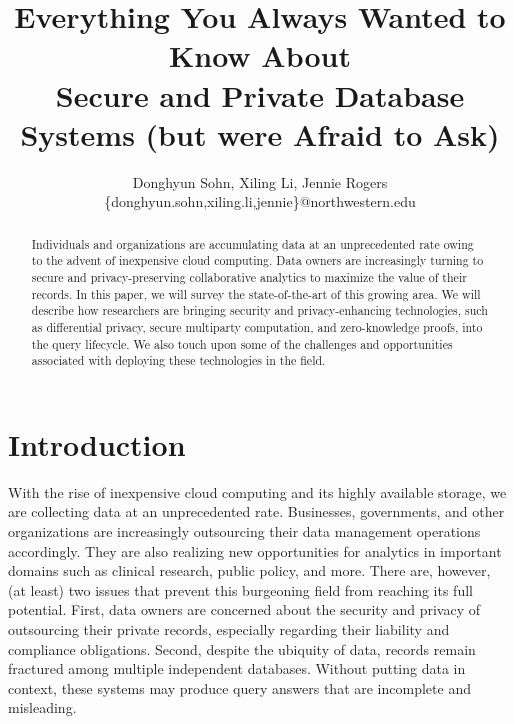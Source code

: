 \documentclass[11pt]{article}
\begin{document}
\title{Everything You Always Wanted to Know About\\ Secure and Private Database Systems (but were Afraid to Ask)}



\author{Donghyun Sohn, Xiling Li, Jennie Rogers\\
\{donghyun.sohn,xiling.li,jennie\}@northwestern.edu}


\maketitle


\begin{abstract}
Individuals and organizations are accumulating data at an unprecedented rate owing to the advent of inexpensive cloud computing.  Data owners are increasingly turning to secure and privacy-preserving collaborative analytics to maximize the value of their records. In this paper, we will survey the state-of-the-art of this growing area.   We will describe how researchers are bringing security and privacy-enhancing technologies, such as differential privacy, secure multiparty computation, and zero-knowledge proofs, into the query lifecycle.  We also touch upon some of the challenges and opportunities associated with deploying these technologies in the field.
\end{abstract}


\section{Introduction}


With the rise of inexpensive cloud computing and its highly available storage, we are collecting data at an unprecedented rate.    Businesses, governments, and other organizations are increasingly outsourcing their data management operations accordingly.  They are also realizing new opportunities for analytics in important domains such as clinical research, public policy, and more.  There are, however, (at least) two issues that prevent this burgeoning field from reaching its full potential. First, data owners are concerned about the security and privacy of outsourcing their private records, especially regarding their liability and compliance obligations.  Second, despite the ubiquity of data, records remain fractured among multiple independent databases.  Without putting data in context, these systems may produce query answers that are incomplete and misleading. 
\end{document}
